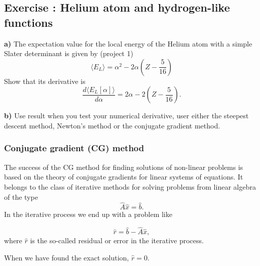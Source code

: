 \documentclass{beamer}
\newenvironment{doconceexercise}{}{}
\newcounter{doconceexercisecounter}
\newcounter{doconce:movie:counter}
\newcommand{\subex}[1]{\noindent\textbf{#1}}  %
\begin{document}
\begin{frame}

\begin{doconceexercise}

\subsection*{Exercise \thedoconceexercisecounter: Helium atom and hydrogen-like functions}



\subex{a)}
The expectation value for the local energy of the Helium atom with a simple Slater determinant is given by (project 1)
\[
\langle E_{L} \rangle = \alpha^2-2\alpha\left(Z-\frac{5}{16}\right)
\]
Show that its derivative is 
\begin{equation*}
\frac{d\langle E_{L}[\alpha] \rangle}{d\alpha} = 2\alpha-2\left(Z-\frac{5}{16}\right).
\end{equation*}

\subex{b)}
Use result when you test your numerical derivative, user either the steepest descent method, Newton's method or the conjugate
gradient method.




\end{doconceexercise}
\end{frame}

\begin{frame}
\frametitle{Conjugate gradient (CG) method}

\begin{block}{}
The success of the CG method  for finding solutions of non-linear problems is based
on the theory of conjugate gradients for linear systems of equations. It belongs
to the class of iterative methods for solving problems from linear algebra of the type
\begin{equation*}
  \hat{A}\hat{x} = \hat{b}.
\end{equation*}
In the iterative process we end up with a problem like

\begin{equation*}
  \hat{r}= \hat{b}-\hat{A}\hat{x},
\end{equation*}
where $\hat{r}$ is the so-called residual or error in the iterative process.

When we have found the exact solution, $\hat{r}=0$.
\end{block}
\end{frame}
\end{document}
